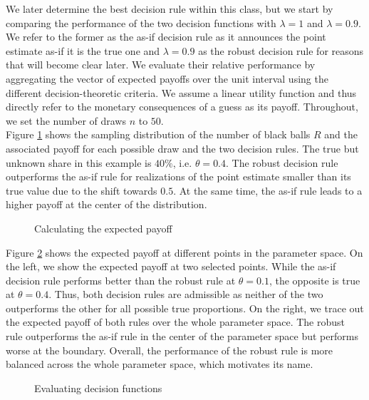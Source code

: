 We later determine the best decision rule within this class, but we start by comparing the performance of the two decision functions with $\lambda = 1$ and $\lambda = 0.9$. We refer to the former as the as-if decision rule as it announces the point estimate as-if it is the true one and $\lambda=0.9$ as the robust decision rule for reasons that will become clear later. We evaluate their relative performance by aggregating the vector of expected payoffs over the unit interval using the different decision-theoretic criteria. We assume a linear utility function and thus directly refer to the monetary consequences of a guess as its payoff. Throughout, we set the number of draws $n$ to  $50$.\\

Figure \ref{Calculation of expected payoff} shows the sampling distribution of the number of black balls $R$ and the associated payoff for each possible draw and the two decision rules. The true but unknown share in this example is $40\%$, i.e. $\theta = 0.4$. The robust decision rule outperforms the as-if rule for realizations of the point estimate smaller than its true value due to the shift towards $0.5$. At the same time, the as-if rule leads to a higher payoff at the center of the distribution.\\

\begin{figure}[h!]\centering
{}
\caption{Calculating the expected payoff}\label{Calculation of expected payoff}
\end{figure}\FloatBarrier

Figure \ref{Measurement of performance} shows the expected payoff at different points in the parameter space. On the left, we show the expected payoff at two selected points. While the as-if decision rule performs better than the robust rule at $\theta = 0.1$, the opposite is true at $\theta = 0.4$. Thus, both decision rules are admissible as neither of the two outperforms the other for all possible true proportions. On the right, we trace out the expected payoff of both rules over the whole parameter space. The robust rule outperforms the as-if rule in the center of the parameter space but performs worse at the boundary. Overall, the performance of the robust rule is more balanced across the whole parameter space, which motivates its name.

\begin{figure}[h!]\centering
{}\hspace{0.3cm}
\caption{Evaluating decision functions}\label{Measurement of performance}
\end{figure}\FloatBarrier

